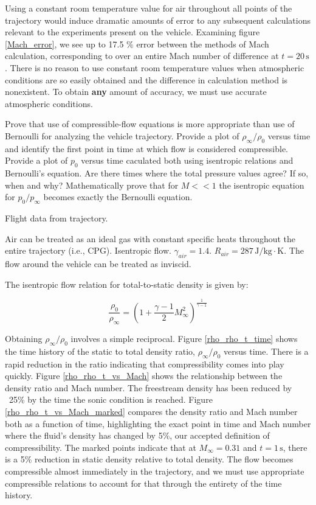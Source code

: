 \documentclass[../main.tex]{subfiles}
\begin{document}
\discussion{}

Using a constant room temperature value for air throughout all points of the trajectory would induce dramatic amounts of error to any subsequent calculations relevant to the experiments present on the vehicle.
Examining figure \ref{Mach_error}, we see up to 17.5 \% error between the methods of Mach calculation, corresponding to over an entire Mach number of difference at \(t=20\,\unit{\s}\).
There is no reason to use constant room temperature values when atmospheric conditions are so easily obtained and the difference in calculation method is nonexistent. 
To obtain \textbf{any} amount of accuracy, we must use accurate atmospheric conditions.

\clearpage


Prove that use of compressible-flow equations is more appropriate than use of Bernoulli for analyzing the vehicle trajectory.
Provide a plot of \(\rho_\infty/\rho_0\) versus time and identify the first point in time at which flow is considered compressible.
Provide a plot of \(p_0\) versus time caculated both using isentropic relations and Bernoulli's equation.
Are there times where the total pressure values agree?
If so, when and why?
Mathematically prove that for \(M<<1\) the isentropic equation for \(p_0/p_\infty\) becomes exactly the Bernoulli equation.

\givens{}
Flight data from trajectory.

\assumptions{}
Air can be treated as an ideal gas with constant specific heats throughout the entire trajectory (i.e., CPG).
Isentropic flow.
\(\gamma_{air} = 1.4\). 
\(R_{air} = 287 \, \unit{\joule/\kilogram\cdot\kelvin}\). 
The flow around the vehicle can be treated as inviscid.

\solution{}

The isentropic flow relation for total-to-static density is given by:

\[
    \frac{\rho_0}{\rho_\infty} = \left({1 + \frac{\gamma-1}{2} M_\infty^2}\right) ^ {\frac{1}{\gamma-1}}   
\]

Obtaining \(\rho_\infty/\rho_0\) involves a simple reciprocal.
Figure \ref{rho_rho_t_time} shows the time history of the static to total density ratio, \(\rho_\infty/\rho_0\) versus time.
There is a rapid reduction in the ratio indicating that compressibility comes into play quickly. 
Figure \ref{rho_rho_t_vs_Mach} shows the relationship between the density ratio and Mach number.
The freestream density has been reduced by ~25\% by the time the sonic condition is reached.
Figure \ref{rho_rho_t_vs_Mach_marked} compares the density ratio and Mach number both as a function of time, highlighting the exact point in time and Mach number where the fluid's density has changed by 5\%, our accepted definition of compressibility.
The marked points indicate that at \(M_\infty = 0.31\) and \(t=1 \, \unit{\s}\), there is a 5\% reduction in static density relative to total density.
The flow becomes compressible almost immediately in the trajectory, and we must use appropriate compressible relations to account for that through the entirety of the time history.
\end{document}
